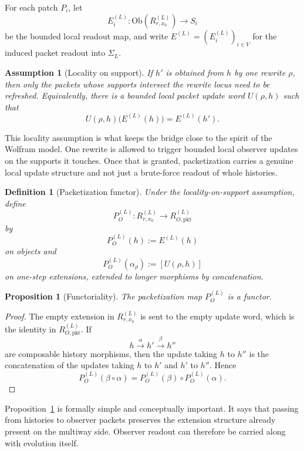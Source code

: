 \documentclass[11pt]{article}
\newtheorem{proposition}[theorem]{Proposition}
\newtheorem{definition}[theorem]{Definition}
\newtheorem{assumption}[theorem]{Assumption}
\theoremstyle{remark}
\theoremstyle{plain}
\begin{document}
For each patch \(P_i\), let
\[
E_i^{(L)}:\mathrm{Ob}(R^{(L)}_{r,x_0})\to S_i
\]
be the bounded local readout map, and write \(E^{(L)}=(E_i^{(L)})_{i\in V}\) for the induced packet readout into \(\Sigma_L\).

\begin{assumption}[Locality on support]
If \(h'\) is obtained from \(h\) by one rewrite \(\rho\), then only the packets whose supports intersect the rewrite locus need to be refreshed. Equivalently, there is a bounded local packet update word \(U(\rho,h)\) such that
\[
U(\rho,h)\bigl(E^{(L)}(h)\bigr)=E^{(L)}(h').
\]
\end{assumption}

This locality assumption is what keeps the bridge close to the spirit of the Wolfram model. One rewrite is allowed to trigger bounded local observer updates on the supports it touches. Once that is granted, packetization carries a genuine local update structure and not just a brute-force readout of whole histories.

\begin{definition}[Packetization functor]
Under the locality-on-support assumption, define
\[
P_O^{(L)}:R^{(L)}_{r,x_0}\to R^{(L)}_{O,\mathrm{pkt}}
\]
by
\[
P_O^{(L)}(h):=E^{(L)}(h)
\]
on objects and
\[
P_O^{(L)}(\alpha_\rho):=[U(\rho,h)]
\]
on one-step extensions, extended to longer morphisms by concatenation.
\end{definition}

\begin{proposition}[Functoriality]
\label{prop:packetfunctor}
The packetization map \(P_O^{(L)}\) is a functor.
\end{proposition}

\begin{proof}
The empty extension in \(R^{(L)}_{r,x_0}\) is sent to the empty update word, which is the identity in \(R^{(L)}_{O,\mathrm{pkt}}\). If
\[
h\xrightarrow{\alpha}h'\xrightarrow{\beta}h''
\]
are composable history morphisms, then the update taking \(h\) to \(h''\) is the concatenation of the updates taking \(h\) to \(h'\) and \(h'\) to \(h''\). Hence
\[
P_O^{(L)}(\beta\circ\alpha)
=
P_O^{(L)}(\beta)\circ P_O^{(L)}(\alpha).
\]
\end{proof}

Proposition~\ref{prop:packetfunctor} is formally simple and conceptually important. It says that passing from histories to observer packets preserves the extension structure already present on the multiway side. Observer readout can therefore be carried along with evolution itself.
\end{document}
